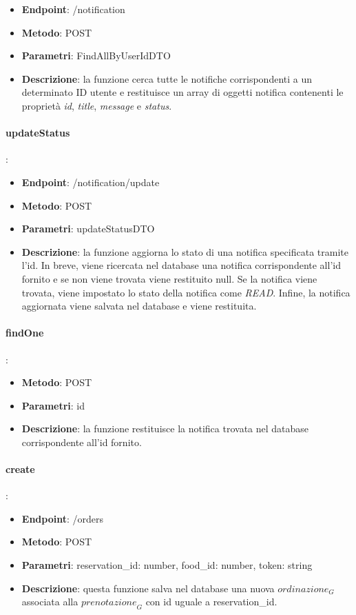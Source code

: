 \begin{itemize}
    \item \textbf{Endpoint}: /notification
    \item \textbf{Metodo}: POST
    \item \textbf{Parametri}: FindAllByUserIdDTO
    \item \textbf{Descrizione}: la funzione cerca tutte le notifiche corrispondenti a un determinato ID utente e restituisce un array di oggetti notifica contenenti le proprietà \emph{id}, \emph{title}, \emph{message} e \emph{status}.
\end{itemize}
\paragraph{updateStatus}:
\begin{itemize}
    \item \textbf{Endpoint}: /notification/update
    \item \textbf{Metodo}: POST
    \item \textbf{Parametri}: updateStatusDTO
    \item \textbf{Descrizione}: la funzione aggiorna lo stato di una notifica specificata tramite l'id. In breve, viene ricercata nel database una notifica corrispondente all'id fornito e se non viene trovata viene restituito null. Se la notifica viene trovata, viene impostato lo stato della notifica come \emph{READ}. Infine, la notifica aggiornata viene salvata nel database e viene restituita. 
\end{itemize}
\paragraph{findOne}:
\begin{itemize}
    \item \textbf{Metodo}: POST
    \item \textbf{Parametri}: id
    \item \textbf{Descrizione}: la funzione restituisce la notifica trovata nel database corrispondente all'id fornito.
\end{itemize}
\paragraph{create}:
\begin{itemize}
    \item \textbf{Endpoint}: /orders
    \item \textbf{Metodo}: POST
    \item \textbf{Parametri}: reservation\_id: number, food\_id: number, token: string
    \item \textbf{Descrizione}: questa funzione salva nel database una nuova $\textit{ordinazione}_G$ associata alla $\textit{prenotazione}_G$ con id uguale a reservation\_id.
\end{itemize}
